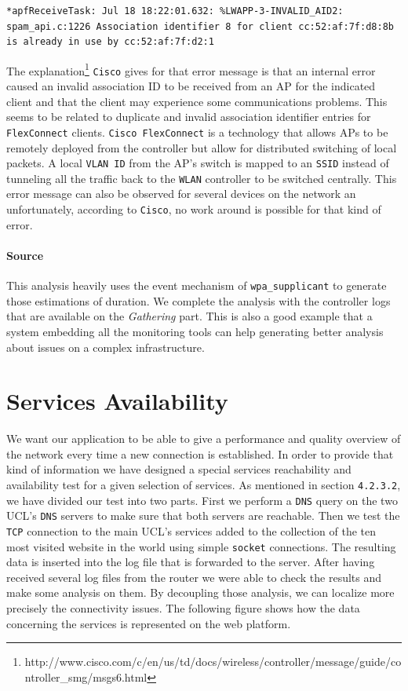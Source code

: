 \begin{lstlisting}[frame=single,breaklines=true,caption={\texttt{WiSM} association error message}]
*apfReceiveTask: Jul 18 18:22:01.632: %LWAPP-3-INVALID_AID2: spam_api.c:1226 Association identifier 8 for client cc:52:af:7f:d8:8b is already in use by cc:52:af:7f:d2:1
\end{lstlisting}

The explanation\footnote{http://www.cisco.com/c/en/us/td/docs/wireless/controller/message/guide/controller\_smg/msgs6.html} \texttt{Cisco} gives for that error message is that an internal error caused an invalid association ID to be received from an AP for the indicated client and that the client may experience some communications problems. This seems to be related to duplicate and invalid association identifier entries for \texttt{FlexConnect} clients. \texttt{Cisco FlexConnect} is a technology that allows APs to be remotely deployed from the controller but allow for distributed switching of local packets. A local \texttt{VLAN ID} from the AP's switch is mapped to an \texttt{SSID} instead of tunneling all the traffic back to the \texttt{WLAN} controller to be switched centrally. This error message can also be observed for several devices on the network an unfortunately, according to \texttt{Cisco}, no work around is possible for that kind of error.


\paragraph*{Source} This analysis heavily uses the event mechanism of \texttt{wpa\_supplicant} to generate those estimations of duration. We complete the analysis with the controller logs that are available on the \emph{Gathering} part. This is also a good example that a system embedding all the monitoring tools can help generating better analysis about issues on a complex infrastructure.


\section{Services Availability}
We want our application to be able to give a performance and quality overview of the network every time a new connection is established. In order to provide that kind of information we have designed a special services reachability and availability test for a given selection of services. As mentioned in section \texttt{4.2.3.2}, we have divided our test into two parts. First we perform a \texttt{DNS} query on the two UCL's \texttt{DNS} servers to make sure that both servers are reachable. Then we test the \texttt{TCP} connection to the main UCL's services added to the collection of the ten most visited website in the world using simple \texttt{socket} connections. The resulting data is inserted into the log file that is forwarded to the server. After having received several log files from the router we were able to check the results and make some analysis on them. By decoupling those analysis, we can localize more precisely the connectivity issues. The following figure shows how the data concerning the services is represented on the web platform.

